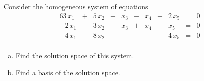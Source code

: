 
\begin{exerciseStatement}


Consider the homogeneous system of equations 
\begin{alignat*}{6} 3 \, x_{1} &+& 5 \, x_{2} &+& x_{3} &-& x_{4} &+& 2 \, x_{5} &=& 0 \\-2 \, x_{1} &-& 3 \, x_{2} &-& x_{3} &+& x_{4} &-& x_{5} &=& 0 \\-4 \, x_{1} &-& 8 \, x_{2} & &  & &  &-& 4 \, x_{5} &=& 0 \\ \end{alignat*}
            


\begin{enumerate}[(a)]
\item  Find the solution space of this system.
\item  Find a basis of the solution space.
\end{enumerate}
    
\end{exerciseStatement}
    
